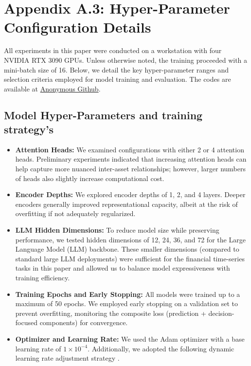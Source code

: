 \section*{Appendix A.3: Hyper-Parameter Configuration Details} \label{Appendix:A3}

All experiments in this paper were conducted on a workstation with four NVIDIA RTX 3090 GPUs. Unless otherwise noted, the training proceeded with a mini-batch size of 16. Below, we detail the key hyper-parameter ranges and selection criteria employed for model training and evaluation. The codes are available at \href{https://anonymous.4open.science/r/Decision-informed-Neural-Networks-with-Large-Language-Model-Integration-for-Portfolio-Optimization-A441/README.md}{Anonymous Github}.



\subsection*{Model Hyper-Parameters and training strategy's}
\begin{itemize}
\item \textbf{Attention Heads:} We examined configurations with either 2 or 4 attention heads. Preliminary experiments indicated that increasing attention heads can help capture more nuanced inter-asset relationships; however, larger numbers of heads also slightly increase computational cost.
\item \textbf{Encoder Depths:} We explored encoder depths of 1, 2, and 4 layers. Deeper encoders generally improved representational capacity, albeit at the risk of overfitting if not adequately regularized.
\item \textbf{LLM Hidden Dimensions:} To reduce model size while preserving performance, we tested hidden dimensions of 12, 24, 36, and 72 for the Large Language Model (LLM) backbone. These smaller dimensions (compared to standard large LLM deployments) were sufficient for the financial time-series tasks in this paper and allowed us to balance model expressiveness with training efficiency.
\item \textbf{Training Epochs and Early Stopping:} All models were trained up to a maximum of 50 epochs. We employed early stopping on a validation set to prevent overfitting, monitoring the composite loss (prediction + decision-focused components) for convergence.
\item \textbf{Optimizer and Learning Rate:} We used the Adam optimizer with a base learning rate of $1 \times 10^{-4}$. Additionally, we adopted the following dynamic learning rate adjustment strategy \citep{jin2023time}.

\end{itemize}

